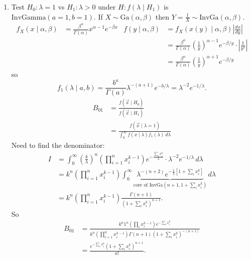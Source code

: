 \documentclass[10pt, a4paper]{article}
\begin{document}
\begin{problem}
\begin{solution}
\begin{enumerate}[label = (\arabic*)]
            \item
            Test $H_0 : \lambda = 1$ vs $H_1 : \lambda > 0$ under $H : f(\lambda \mid H_1)$ is $\mathrm{InvGamma}(a = 1, b = 1)$.
            If $X \sim \mathrm{Ga}(\alpha, \beta)$ then $Y = \frac{1}{X} \sim \mathrm{InvGa}(\alpha, \beta)$.
            \begin{align*}
                f_{X}(x \mid \alpha, \beta) &= \frac{\beta ^ {\alpha}}{\Gamma(\alpha)}x ^ {\alpha - 1}e ^ {-\beta x} & f(y \mid \alpha, \beta) &= f_{X}(x(y) \mid \alpha, \beta)\left|\frac{dx}{dy}\right| \\
                && &= \frac{\beta ^ {\alpha}}{\Gamma(\alpha)}\left(\frac{1}{y}\right) ^ {\alpha - 1}e ^ {-\beta / y}\cdot \left|\frac{1}{y ^ 2}\right| \\
                && &= \frac{\beta ^ {\alpha}}{\Gamma(\alpha)}\left(\frac{1}{y}\right) ^ {\alpha + 1}e ^ {-\beta / y}
            \end{align*}
            so
            \[
            f_1(\lambda \mid a, b) = \frac{b ^ a}{\Gamma(a)}\lambda ^ {-(a + 1)}e ^ {-b / \lambda} = \lambda ^ {-2}e ^ {-1 / \lambda}.
            \]
            \begin{align*}
                B_{01} &= \frac{f(\vec{x} \mid H_0)}{f(\vec{x} \mid H_1)} \\
                &= \frac{f(\vec{x} \mid \lambda = 1)}{\int_{0}^{\infty}f(x \mid \lambda)f_1(\lambda)\,d\lambda}
            \end{align*}
            Need to find the denominator:
            \begin{align*}
                I &= \int_{0}^{\infty}\left(\frac{k}{\lambda}\right)^n\left(\prod_{i = 1}^{n}x_i ^ {k - 1}\right)e ^ {-\frac{\sum_i x_i ^ k}{\lambda}}\cdot\lambda ^ {-2}e ^ {-1 / \lambda}\,d\lambda \\
                &= k ^ n\left(\prod_{i = 1}^{n}x_i ^ {k - 1}\right)\int_{0}^{\infty}\underbrace{\lambda ^ {-(n + 2)}e ^ {-\frac{1}{\lambda}\left[1 + \sum_{i}x_i ^ k\right]}}_{\text{core of $\mathrm{InvGa}(n + 1, 1+ \sum_{i}x_i ^ k)$}}\,d\lambda \\
                &= k ^ n\left(\prod_{i = 1}^{n}x_i ^ {k - 1}\right)\frac{\Gamma(n + 1)}{\left(1 + \sum_{i}x_i ^ {k}\right) ^ {n + 1}}.
            \end{align*}
            So
            \begin{align*}
                B_{01} &= \frac{k ^ n1 ^ n\left(\prod_{i}x_i ^ {k - 1}\right)e ^ {-\sum_{i}x_i ^ k}}{k ^ n\left(\prod_{i = 1}^{n}x_i ^ {k - 1}\right)\Gamma(n + 1)\left(1 + \sum_{i}x_i ^ k\right) ^ {-(n + 1)}} \\
                &= \frac{e ^ {-\sum_{i}x_i ^ k}\left(1 + \sum_{i}x_i ^ k\right) ^ {n + 1}}{n!}.
            \end{align*}


\end{enumerate}
\end{solution}
\end{problem}
\end{document}
